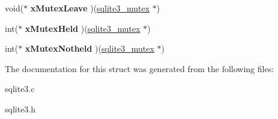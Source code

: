 \begin{DoxyCompactItemize}
\item 
void($\ast$ {\bfseries x\+Mutex\+Leave} )(\hyperlink{structsqlite3__mutex}{sqlite3\+\_\+mutex} $\ast$)\hypertarget{structsqlite3__mutex__methods_acfa193f9130bfc68caf7f1849bcd0dac}{}\label{structsqlite3__mutex__methods_acfa193f9130bfc68caf7f1849bcd0dac}

\item 
int($\ast$ {\bfseries x\+Mutex\+Held} )(\hyperlink{structsqlite3__mutex}{sqlite3\+\_\+mutex} $\ast$)\hypertarget{structsqlite3__mutex__methods_a5d30a95c614bc08fe156c9ea0f0d88e8}{}\label{structsqlite3__mutex__methods_a5d30a95c614bc08fe156c9ea0f0d88e8}

\item 
int($\ast$ {\bfseries x\+Mutex\+Notheld} )(\hyperlink{structsqlite3__mutex}{sqlite3\+\_\+mutex} $\ast$)\hypertarget{structsqlite3__mutex__methods_a7bc1edfd01c67c6dcee26299bc31a7bf}{}\label{structsqlite3__mutex__methods_a7bc1edfd01c67c6dcee26299bc31a7bf}

\end{DoxyCompactItemize}


The documentation for this struct was generated from the following files\+:\begin{DoxyCompactItemize}
\item 
sqlite3.\+c\item 
sqlite3.\+h\end{DoxyCompactItemize}
